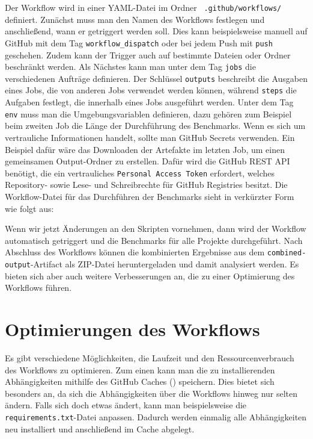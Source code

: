 Der Workflow wird in einer YAML-Datei im Ordner ~\texttt{.github/workflows/} definiert.
Zunächst muss man den Namen des Workflows festlegen und anschließend, wann er getriggert werden soll.
Dies kann beispielsweise manuell auf GitHub mit dem Tag \texttt{workflow\_dispatch} oder bei jedem Push mit \texttt{push} geschehen.
Zudem kann der Trigger auch auf bestimmte Dateien oder Ordner beschränkt werden.
Als Nächstes kann man unter dem Tag \texttt{jobs} die verschiedenen Aufträge definieren.
Der Schlüssel \texttt{outputs} beschreibt die Ausgaben eines Jobs, die von anderen Jobs verwendet werden können, während \texttt{steps} die Aufgaben festlegt, die innerhalb eines Jobs ausgeführt werden.
Unter dem Tag \texttt{env} muss man die Umgebungsvariablen definieren, dazu gehören zum Beispiel beim zweiten Job die Länge der Durchführung des Benchmarks.
Wenn es sich um vertrauliche Informationen handelt, sollte man GitHub Secrets verwenden.
Ein Beispiel dafür wäre das Downloaden der Artefakte im letzten Job, um einen gemeinsamen Output-Ordner zu erstellen.
Dafür wird die GitHub REST API benötigt, die ein vertrauliches \texttt{Personal Access Token} erfordert, welches Repository- sowie Lese- und Schreibrechte für GitHub Registries besitzt.
Die Workflow-Datei für das Durchführen der Benchmarks sieht in verkürzter Form wie folgt aus:

\vspace{-5pt}

\vspace{-5pt}

Wenn wir jetzt Änderungen an den Skripten vornehmen, dann wird der Workflow automatisch getriggert und die Benchmarks für alle Projekte durchgeführt.
Nach Abschluss des Workflows können die kombinierten Ergebnisse aus dem \texttt{combined-output}-Artifact als ZIP-Datei heruntergeladen und damit analysiert werden.
Es bieten sich aber auch weitere Verbesserungen an, die zu einer Optimierung des Workflows führen.

\section{Optimierungen des Workflows}\label{sec:optimierungen-des-workflows}

Es gibt verschiedene Möglichkeiten, die Laufzeit und den Ressourcenverbrauch des Workflows zu optimieren.
Zum einen kann man die zu installierenden Abhängigkeiten mithilfe des GitHub Caches (\cite{github_cache_doku}) speichern.
Dies bietet sich besonders an, da sich die Abhängigkeiten über die Workflows hinweg nur selten ändern.
Falls sich doch etwas ändert, kann man beispielsweise die \texttt{require\allowbreak ments.txt}-Datei anpassen.
Dadurch werden einmalig alle Abhängigkeiten neu installiert und anschließend im Cache abgelegt.

